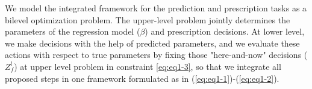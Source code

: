 \documentclass[12pt]{article}
\begin{document}
We model the integrated framework for the prediction and prescription tasks as a bilevel optimization problem. The upper-level problem jointly determines the parameters of the regression model ($\beta$) and prescription decisions. At lower level, we make decisions with the help of predicted parameters, and we evaluate these actions with respect to true parameters by fixing those "here-and-now" decisions ($Z_f^l$) at upper level problem in constraint \ref{eq:eq1-3}, so that we integrate all proposed steps in one framework formulated as in (\ref{eq:eq1-1})-(\ref{eq:eq1-2}).
\end{document}
